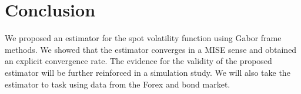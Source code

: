 \section{Conclusion} \label{sec:conclusion}
We proposed an estimator for the spot volatility function using Gabor frame methods. We showed that the estimator converges in a MISE sense and obtained an explicit convergence rate.  The evidence for the validity of the proposed estimator will be further reinforced in a simulation study. We will also take the estimator to task using data from the Forex and bond market. 




